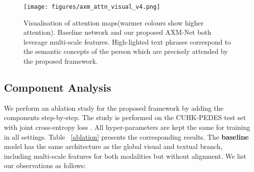 \documentclass[letterpaper]{article} \usepackage{aaai22}  \usepackage{times}  \usepackage{helvet}  \usepackage{courier}  \usepackage[hyphens]{url}  \usepackage{graphicx} \urlstyle{rm} \def\UrlFont{\rm}  \usepackage{natbib}  \usepackage{caption} \DeclareCaptionStyle{ruled}{labelfont=normalfont,labelsep=colon,strut=off} \frenchspacing  \setlength{\pdfpagewidth}{8.5in}  \setlength{\pdfpageheight}{11in}  \usepackage{algorithm}
\begin{document}
\begin{figure*}[!htbp]
\centering
        \texttt{[image: figures/axm\_attn\_visual\_v4.png]}
        \caption{Visualisation of attention maps(warmer colours show higher attention). Baseline network and our proposed AXM-Net both leverage multi-scale features. High-lighted text phrases correspond to the semantic concepts of the person which are precisely attended by the proposed framework.}
    \label{attn_visual}
\end{figure*}

\subsection{Component Analysis}
We perform an ablation study for the proposed framework by adding the components step-by-step. The study is performed on the CUHK-PEDES test set with joint cross-entropy loss . All hyper-parameters are kept the same for training in all settings. Table ~\ref{ablation} presents the corresponding results. The \textbf{baseline} model has the same architecture as the global visual and textual branch, including multi-scale features for both modalities but without alignment. We list our observations as follows:
\end{document}
